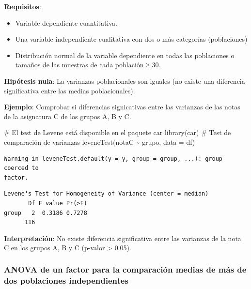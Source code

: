 \documentclass[
  a4paper,
]{scrreport}
\newenvironment{Shaded}{\begin{snugshade}}{\end{snugshade}}
\newcommand{\AttributeTok}[1]{\textcolor[rgb]{0.40,0.45,0.13}{#1}}
\newcommand{\CommentTok}[1]{\textcolor[rgb]{0.37,0.37,0.37}{#1}}
\newcommand{\FunctionTok}[1]{\textcolor[rgb]{0.28,0.35,0.67}{#1}}
\newcommand{\NormalTok}[1]{\textcolor[rgb]{0.00,0.23,0.31}{#1}}
\newcommand{\SpecialCharTok}[1]{\textcolor[rgb]{0.37,0.37,0.37}{#1}}
\providecommand{\tightlist}{%
  \setlength{\itemsep}{0pt}\setlength{\parskip}{0pt}}\usepackage{longtable,booktabs,array}
\theoremstyle{definition}
\theoremstyle{definition}
\theoremstyle{remark}
\begin{document}
\textbf{Requisitos}:

\begin{itemize}
\tightlist
\item
  Variable dependiente cuantitativa.
\item
  Una variable independiente cualitativa con dos o más categorías
  (poblaciones)
\item
  Distribución normal de la variable dependiente en todas las
  poblaciones o tamaños de las muestras de cada población ≥ 30.
\end{itemize}

\textbf{Hipótesis nula}: La varianzas poblacionales son iguales (no
existe una diferencia significativa entre las medias poblacionales).

\textbf{Ejemplo}: Comprobar si diferencias signicativas entre las
varianzas de las notas de la asignatura C de los grupos A, B y C.

\begin{Shaded}
\begin{Highlighting}[]
\CommentTok{\# El test de Levene está disponible en el paquete car}
\FunctionTok{library}\NormalTok{(car)}
\CommentTok{\# Test de comparación de varianzas}
\FunctionTok{leveneTest}\NormalTok{(notaC }\SpecialCharTok{\textasciitilde{}}\NormalTok{ grupo, }\AttributeTok{data =}\NormalTok{ df)}
\end{Highlighting}
\end{Shaded}

\begin{verbatim}
Warning in leveneTest.default(y = y, group = group, ...): group coerced to
factor.
\end{verbatim}

\begin{verbatim}
Levene's Test for Homogeneity of Variance (center = median)
       Df F value Pr(>F)
group   2  0.3186 0.7278
      116               
\end{verbatim}

\textbf{Interpretación}: No existe diferencia significativa entre las
varianzas de la nota C en los grupos A, B y C (p-valor \textgreater{}
0.05).

\hypertarget{anova-de-un-factor-para-la-comparaciuxf3n-medias-de-muxe1s-de-dos-poblaciones-independientes}{%
\subsubsection{ANOVA de un factor para la comparación medias de más de
dos poblaciones
independientes}\label{anova-de-un-factor-para-la-comparaciuxf3n-medias-de-muxe1s-de-dos-poblaciones-independientes}}
\end{document}
